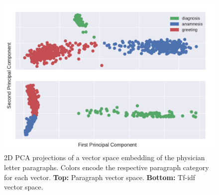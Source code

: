 \begin{figure}
	\includegraphics[width=\linewidth]{figures/para2vec_tfidf_pca}
	\caption{2D PCA projections of a vector space embedding of the physician letter paragraphs. Colors encode the respective paragraph category for each vector. \textbf{Top:} Paragraph vector space.  \textbf{Bottom:} Tf-idf vector space.}
	\label{fig:pv_tf_pca}
\end{figure}

